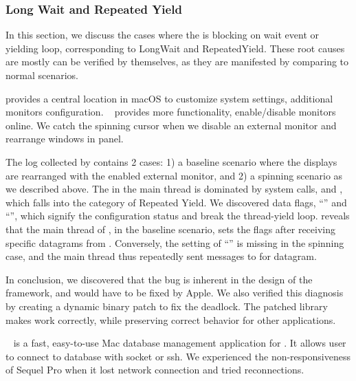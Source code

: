 \subsubsection{Long Wait and Repeated Yield}

In this section, we discuss the cases where the \spinningnode is blocking on
wait event or yielding loop, corresponding to LongWait and RepeatedYield.
These root causes are mostly can be verified by themselves, as they are
manifested by comparing to normal scenarios.


 provides a central location in macOS to
customize system settings, \eg additional monitors configuration.
~\cite{disablemonitor} provides more functionality,
enable/disable monitors online. We catch the spinning cursor when we disable
an external monitor and rearrange windows in  panel.

The log collected by \xxx contains 2 cases: 1) a baseline scenario where
the displays are rearranged with the enabled external monitor, and 2) a
spinning scenario as we described above. The \spinningnode in the main
thread is dominated by system calls,  and ,
which falls into the category of Repeated Yield. We discovered data flags,
``'' and ``'', which
signify the configuration status and break the thread-yield loop. \xxx reveals
that the main thread of , in the baseline scenario, sets
the flags after receiving specific datagrams from . Conversely,
the setting of ``'' is missing in the spinning case,
and the main thread thus repeatedly sent messages to  for
datagram.

In conclusion, we discovered that the bug is inherent in the design of the
 framework, and would have to be fixed by Apple. We also
verified this diagnosis by creating a dynamic binary patch to fix the deadlock.
The patched library makes  work correctly, while preserving
correct behavior for other applications.


~\cite{SequelPro} is a fast, easy-to-use Mac database management
application for . It allows user to connect to database with socket or ssh.
We experienced the non-responsiveness of Sequel Pro when it lost network
connection and tried reconnections.

